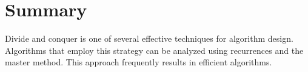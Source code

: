 \section{Summary}

Divide and conquer is one of several effective techniques for algorithm design. 
Algorithms that employ this strategy can be analyzed using recurrences and the master method. 
This approach frequently results in efficient algorithms.
